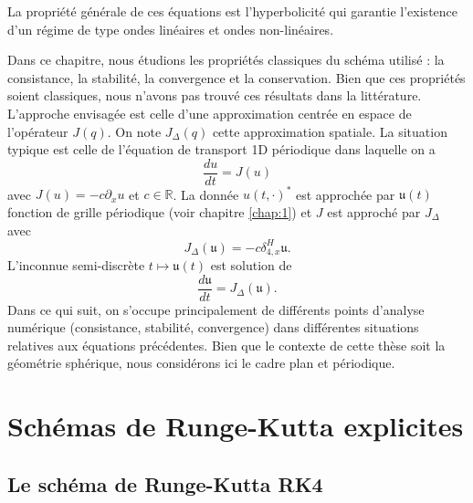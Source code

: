 La propriété générale de ces équations est l'hyperbolicité qui garantie l'existence d'un régime de type ondes linéaires et ondes non-linéaires.

Dans ce chapitre, nous étudions les propriétés classiques du schéma utilisé : la consistance, la stabilité, la convergence et la conservation. Bien que ces propriétés soient classiques, nous n'avons pas trouvé ces résultats dans la littérature.
L'approche envisagée est celle d'une approximation centrée en espace de l'opérateur $J(q)$. On note $J_{\Delta}(q)$ cette approximation spatiale. La situation typique est celle de l'équation de transport 1D périodique dans laquelle on a
\begin{equation}
\dfrac{d u}{dt} = J (u)
\label{eq:edo}
\end{equation}
avec $J(u) = - c \partial_x u$ et $c \in \mathbb{R}$. La donnée $u(t,\cdot)^*$ est approchée par $\mathfrak{u}(t)$ fonction de grille périodique (voir chapitre \ref{chap:1}) et $J$ est approché par $J_{\Delta}$ avec
\begin{equation}
J_{\Delta}(\mathfrak{u}) = - c \delta_{4,x}^H \mathfrak{u}.
\end{equation}
L'inconnue semi-discrète $t \mapsto \mathfrak{u}(t)$ est solution de 
\begin{equation}
\dfrac{d \mathfrak{u}}{dt} = J_{\Delta}(\mathfrak{u}).
\end{equation}
Dans ce qui suit, on s'occupe principalement de différents points d’analyse numérique (consistance, stabilité, convergence) dans différentes situations relatives aux équations précédentes. Bien que le
contexte de cette thèse soit la géométrie sphérique, nous considérons ici le cadre plan et périodique.















\section{Schémas de Runge-Kutta explicites}

\subsection{Le schéma de Runge-Kutta RK4}

